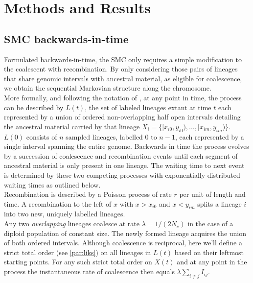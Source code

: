 \documentclass{article}
\begin{document}
\section{Methods and Results}
\subsection{SMC backwards-in-time}\label{par:description}

Formulated backwards-in-time, the SMC \citep{mcvean_approximating_2005} only requires a 
simple modification to the 
coalescent with recombination. By only considering those pairs of 
lineages that share 
genomic intervals with ancestral material, as eligible for coalescence, we obtain the 
sequential Markovian structure along the chromosome.\\

More formally, and following the notation of \citet{mcvean_approximating_2005}, at any 
point in time, the process can be described by $L(t)$, the set of labeled lineages 
extant at time $t$ each represented by a union of ordered non-overlapping half open 
intervals detailing the ancestral material 
carried by that lineage $X_i = \{[x_{i0}, y_{i0}), \dotsc, [x_{im}, y_{im})\}$.
$L(0)$ consists of $n$ sampled lineages, labelled $0$ to $n-1$, each represented by a 
single interval spanning the entire genome.
Backwards in time the process evolves by a succession of coalescence and recombination 
events until each segment of ancestral material is only present in one lineage. 
The waiting time to next event is determined by these two competing processes 
with exponentially distributed waiting times as outlined below.\\

Recombination is described by a Poisson process of rate $r$ per unit of length and time. 
A recombination to the 
left of $x$ with $x>x_{i0}$ and $x<y_{im}$ splits a lineage $i$ into two new, uniquely 
labelled lineages. \\ %

Any two \emph{overlapping} lineages coalesce at rate $\lambda = 1/(2N_e)$ in the case
of a diploid population of constant size. The newly formed lineage acquires the 
union of both ordered intervals. %
Although coalescence is reciprocal, here we'll define a strict total order 
(see \ref{par:liks}) on 
all lineages in $L(t)$ based on their leftmost starting points. 
For any such strict total order on $X(t)$ and at any point in the process 
the instantaneous rate of coalescence then equals $\lambda \sum_{i \neq j} I_{ij}$.
\end{document}
